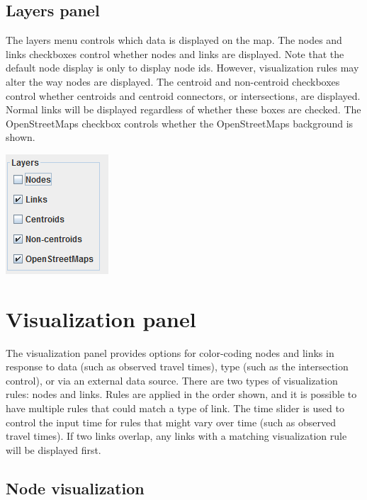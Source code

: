 \subsection{Layers panel}

The layers menu controls which data is displayed on the map. The nodes and links checkboxes control whether nodes and links are displayed. Note that the default node display is only to display node ids. However, visualization rules may alter the way nodes are displayed.
%
The centroid and non-centroid checkboxes control whether centroids and centroid connectors, or intersections, are displayed. Normal links will be displayed regardless of whether these boxes are checked.
%
The OpenStreetMaps checkbox controls whether the OpenStreetMaps background is shown. 

\begin{center}
\includegraphics[scale=1]{images/editor2.png}
\end{center}

\section{Visualization panel}
\label{sec:visualization}

The visualization panel provides options for color-coding nodes and links in response to data (such as observed travel times), type (such as the intersection control), or via an external data source. There are two types of visualization rules: nodes and links. Rules are applied in the order shown, and it is possible to have multiple rules that could match a type of link. The time slider is used to control the input time for rules that might vary over time (such as observed travel times). If two links overlap, any links with a matching visualization rule will be displayed first.

\subsection{Node visualization}

